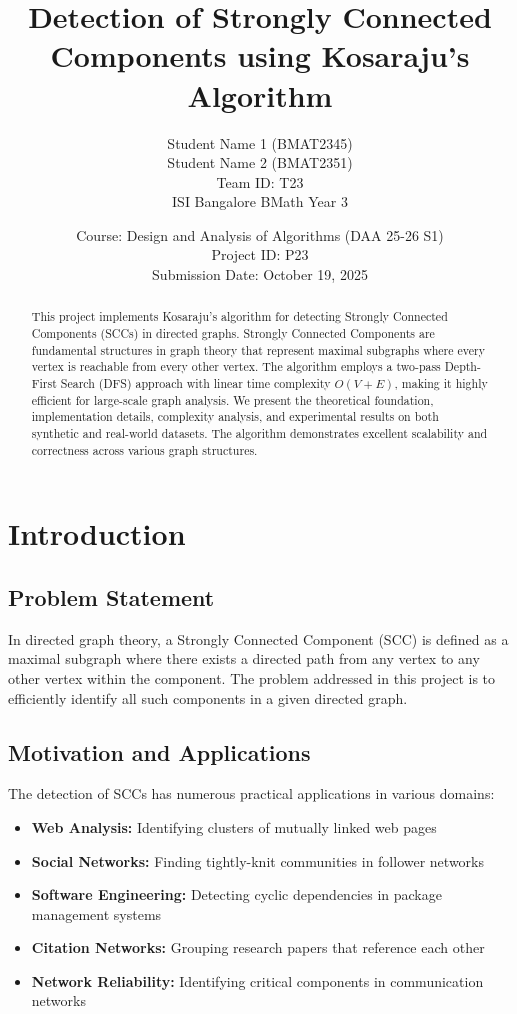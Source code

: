\documentclass[12pt]{article}
\title{\textbf{Detection of Strongly Connected Components using Kosaraju's Algorithm}}
\author{
    Student Name 1 (BMAT2345) \\
    Student Name 2 (BMAT2351) \\
    \small{Team ID: T23} \\
    \small{ISI Bangalore BMath Year 3}
}
\date{
    Course: Design and Analysis of Algorithms (DAA 25-26 S1) \\
    Project ID: P23 \\
    Submission Date: October 19, 2025
}
\begin{document}
\maketitle

\begin{abstract}
This project implements Kosaraju's algorithm for detecting Strongly Connected Components (SCCs) in directed graphs. Strongly Connected Components are fundamental structures in graph theory that represent maximal subgraphs where every vertex is reachable from every other vertex. The algorithm employs a two-pass Depth-First Search (DFS) approach with linear time complexity $O(V + E)$, making it highly efficient for large-scale graph analysis. We present the theoretical foundation, implementation details, complexity analysis, and experimental results on both synthetic and real-world datasets. The algorithm demonstrates excellent scalability and correctness across various graph structures.
\end{abstract}

\section{Introduction}
\subsection{Problem Statement}
In directed graph theory, a Strongly Connected Component (SCC) is defined as a maximal subgraph where there exists a directed path from any vertex to any other vertex within the component. The problem addressed in this project is to efficiently identify all such components in a given directed graph.

\subsection{Motivation and Applications}
The detection of SCCs has numerous practical applications in various domains:

\begin{itemize}
    \item \textbf{Web Analysis:} Identifying clusters of mutually linked web pages
    \item \textbf{Social Networks:} Finding tightly-knit communities in follower networks
    \item \textbf{Software Engineering:} Detecting cyclic dependencies in package management systems
    \item \textbf{Citation Networks:} Grouping research papers that reference each other
    \item \textbf{Network Reliability:} Identifying critical components in communication networks
\end{itemize}
\end{document}
